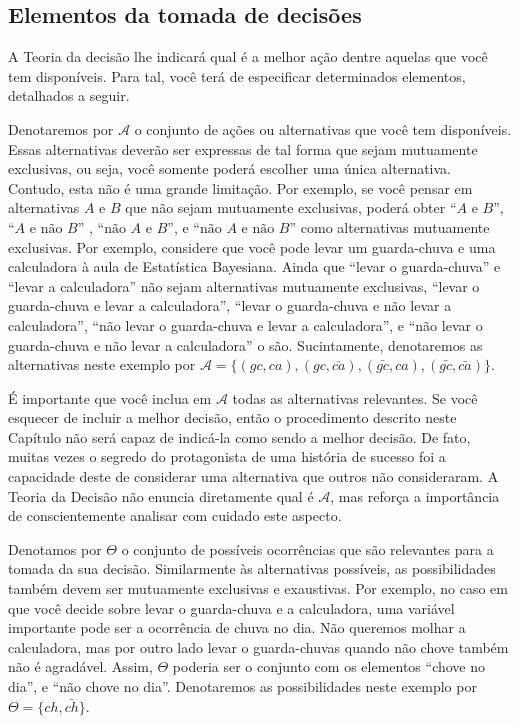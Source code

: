 \subsection{Elementos da tomada de decisões}
\label{section:decisions_elements}

A Teoria da decisão lhe indicará qual é a melhor ação
dentre aquelas que você tem disponíveis.
Para tal, você terá de especificar determinados elementos,
detalhados a seguir.

Denotaremos por $\mathcal{A}$ o conjunto de ações ou alternativas
que você tem disponíveis.
Essas alternativas deverão ser expressas de tal forma que sejam mutuamente exclusivas,
ou seja, você somente poderá escolher uma única alternativa.
Contudo, esta não é uma grande limitação.
Por exemplo, se você pensar em alternativas $A$ e $B$ que não sejam mutuamente exclusivas,
poderá obter ``$A \text{ e } B$'',
``$A \text{ e não } B$'' ,
``$\text{não } A \text{ e } B$'', e
``$\text{não } A \text{ e não } B$''
como alternativas mutuamente exclusivas. Por exemplo, 
considere que você pode levar um guarda-chuva e 
uma calculadora à aula de Estatística Bayesiana.
Ainda que ``levar o guarda-chuva'' e ``levar a calculadora''
não sejam alternativas mutuamente exclusivas,
``levar o guarda-chuva e levar a calculadora'',
``levar o guarda-chuva e não levar a calculadora'',
``não levar o guarda-chuva e levar a calculadora'', e
``não levar o guarda-chuva e não levar a calculadora'' o são.
Sucintamente, denotaremos as alternativas neste exemplo por
$\mathcal{A} = \{(gc,ca), (gc,\bar{ca}), (\bar{gc},ca), (\bar{gc},\bar{ca})\}$.

É importante que você inclua em $\mathcal{A}$
todas as alternativas relevantes.
Se você esquecer de incluir a melhor decisão,
então o procedimento descrito neste Capítulo
não será capaz de indicá-la como sendo a melhor decisão.
De fato, muitas vezes o segredo do protagonista de uma história de sucesso
foi a capacidade deste de considerar uma alternativa que outros não consideraram.
A Teoria da Decisão não
enuncia diretamente qual é $\mathcal{A}$,
mas reforça a importância de conscientemente analisar com cuidado este aspecto.

Denotamos por $\Theta$ o conjunto de possíveis ocorrências
que são relevantes para a tomada da sua decisão.
Similarmente às alternativas possíveis,
as possibilidades também devem ser
mutuamente exclusivas e exaustivas. 
Por exemplo, no caso em que você decide sobre levar o
guarda-chuva e a calculadora,
uma variável importante pode ser a
ocorrência de chuva no dia.
Não queremos molhar a calculadora, mas por outro lado levar o guarda-chuvas quando não chove também não é agradável.
Assim,  $\Theta$ poderia ser
o conjunto com os elementos ``chove no dia'', e 
``não chove no dia''. Denotaremos as
possibilidades neste exemplo por
$\Theta = \{ch, \bar{ch}\}$.

